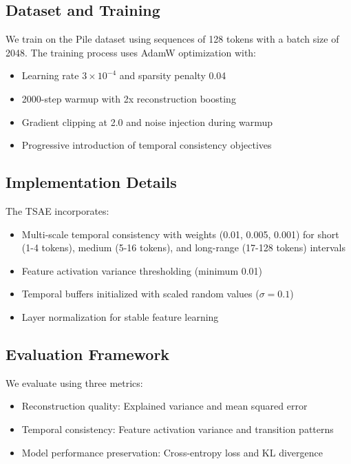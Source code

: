 \documentclass{article} %
\begin{document}
\subsection{Dataset and Training}
We train on the Pile dataset \cite{karpathy2023nanogpt} using sequences of 128 tokens with a batch size of 2048. The training process uses AdamW optimization \cite{loshchilov2017adamw} with:
\begin{itemize}
    \item Learning rate $3\times10^{-4}$ and sparsity penalty 0.04
    \item 2000-step warmup with 2x reconstruction boosting
    \item Gradient clipping at 2.0 and noise injection during warmup
    \item Progressive introduction of temporal consistency objectives
\end{itemize}

\subsection{Implementation Details}
The TSAE incorporates:
\begin{itemize}
    \item Multi-scale temporal consistency with weights (0.01, 0.005, 0.001) for short (1-4 tokens), medium (5-16 tokens), and long-range (17-128 tokens) intervals
    \item Feature activation variance thresholding (minimum 0.01)
    \item Temporal buffers initialized with scaled random values ($\sigma=0.1$)
    \item Layer normalization \cite{ba2016layer} for stable feature learning
\end{itemize}

\subsection{Evaluation Framework}
We evaluate using three metrics:
\begin{itemize}
    \item Reconstruction quality: Explained variance and mean squared error
    \item Temporal consistency: Feature activation variance and transition patterns
    \item Model performance preservation: Cross-entropy loss and KL divergence
\end{itemize}
\end{document}
